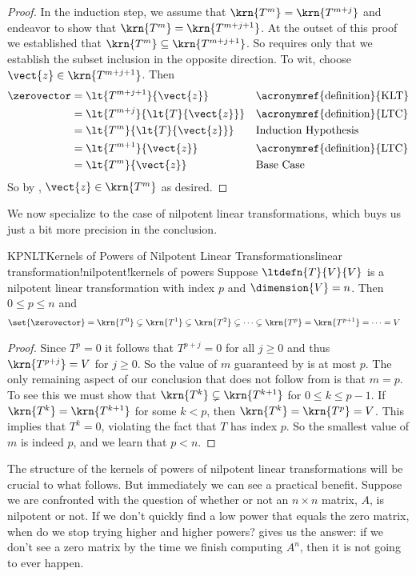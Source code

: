 \begin{proof}
%
In the induction step, we assume that $\krn{T^m}=\krn{T^{m+j}}$ and endeavor to show that $\krn{T^m}=\krn{T^{m+j+1}}$.  At the outset of this proof we established that  $\krn{T^m}\subseteq\krn{T^{m+j+1}}$.  So  requires only that we establish the subset inclusion in the opposite direction.  To wit, choose $\vect{z}\in\krn{T^{m+j+1}}$.  Then
%
\begin{align*}
\zerovector
&=\lt{T^{m+j+1}}{\vect{z}}&&\text{\acronymref{definition}{KLT}}\\
&=\lt{T^{m+j}}{\lt{T}{\vect{z}}}&&\text{\acronymref{definition}{LTC}}\\
&=\lt{T^{m}}{\lt{T}{\vect{z}}}&&\text{Induction Hypothesis}\\
&=\lt{T^{m+1}}{\vect{z}}&&\text{\acronymref{definition}{LTC}}\\
&=\lt{T^{m}}{\vect{z}}&&\text{Base Case}
\end{align*}
%
So by , $\vect{z}\in\krn{T^{m}}$ as desired.
%
\end{proof}
%
We now specialize  to the case of nilpotent linear transformations, which buys us just a bit more precision in the conclusion.
%
\begin{theorem}{KPNLT}{Kernels of Powers of Nilpotent Linear Transformations}{linear transformation!nilpotent!kernels of powers}
Suppose $\ltdefn{T}{V}{V}$ is a nilpotent linear transformation with index $p$ and $\dimension{V}=n$.  Then $0\leq p\leq n$ and
%
\begin{align*}
\set{\zerovector}
&=\krn{T^0}
\subsetneq\krn{T^1}
\subsetneq\krn{T^2}
\subsetneq\cdots
\subsetneq\krn{T^{p}}
=\krn{T^{p+1}}
=\cdots
=V
\end{align*}
%
\end{theorem}
%
\begin{proof}
Since $T^p=0$ it follows that $T^{p+j}=0$ for all $j\geq 0$ and thus $\krn{T^{p+j}}=V$ for $j\geq 0$.  So the value of $m$ guaranteed by  is at most $p$.  The only remaining aspect of our conclusion that does not follow from  is that $m=p$.  To see this we must show that $\krn{T^k}
\subsetneq\krn{T^{k+1}}$ for $0\leq k\leq p-1$.  If $\krn{T^k}=\krn{T^{k+1}}$ for some $k<p$, then $\krn{T^k}=\krn{T^p}=V$.  This implies that $T^k=0$, violating the fact that $T$ has index $p$.  So the smallest value of $m$ is indeed $p$, and we learn that $p<n$.
%
\end{proof}
%
The structure of the kernels of powers of nilpotent linear transformations will be crucial to what follows.  But immediately we can see a practical benefit.  Suppose we are confronted with the question of whether or not an $n\times n$ matrix, $A$, is nilpotent or not.  If we don't quickly find a low power that equals the zero matrix, when do we stop trying higher and higher powers?   gives us the answer: if we don't see a zero matrix by the time we finish computing $A^n$, then it is not going to ever happen.
